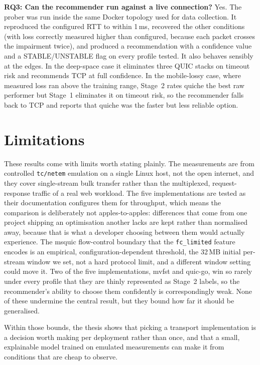 \textbf{RQ3: Can the recommender run against a live connection?} Yes. The prober
was run inside the same Docker topology used for data collection. It reproduced
the configured RTT to within 1\,ms, recovered the other conditions (with loss
correctly measured higher than configured, because each packet crosses the
impairment twice), and produced a recommendation with a confidence value and a
STABLE/UNSTABLE flag on every profile tested. It also behaves sensibly at the
edges. In the deep-space case it eliminates three QUIC stacks on timeout risk
and recommends TCP at full confidence. In the mobile-lossy case, where measured
loss ran above the training range, Stage~2 rates quiche the best raw performer
but Stage~1 eliminates it on timeout risk, so the recommender falls back to TCP
and reports that quiche was the faster but less reliable option.

\section{Limitations}
\label{sec:conclusion-limitations}

These results come with limits worth stating plainly. The measurements are from
controlled \texttt{tc/netem} emulation on a single Linux host, not the open
internet, and they cover single-stream bulk transfer rather than the
multiplexed, request-response traffic of a real web workload. The five
implementations are tested as their documentation configures them for
throughput, which means the comparison is deliberately not apples-to-apples:
differences that come from one project shipping an optimisation another lacks
are kept rather than normalised away, because that is what a developer choosing
between them would actually experience. The msquic flow-control boundary that
the \texttt{fc\_limited} feature encodes is an empirical, configuration-dependent
threshold, the 32\,MB initial per-stream window we set, not a hard protocol
limit, and a different window setting could move it. Two of the five
implementations, mvfst and quic-go, win so rarely under every profile that they
are thinly represented as Stage~2 labels, so the recommender's ability to choose
them confidently is correspondingly weak. None of these undermine the central
result, but they bound how far it should be generalised.

Within those bounds, the thesis shows that picking a transport implementation is
a decision worth making per deployment rather than once, and that a small,
explainable model trained on emulated measurements can make it from conditions
that are cheap to observe.
